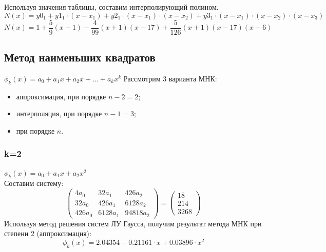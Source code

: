 \documentclass{article}
\begin{document}
Используя значения таблицы, составим интерполирующий полином.
\begin{displaymath} 
  N(x) = y0_1 + y1_{1} \cdot (x-x_1) + y2_1 \cdot (x-x_1) \cdot (x-x_2) +
  y3_1 \cdot (x-x_1) \cdot (x-x_2) \cdot (x-x_3) 
\end{displaymath}
\begin{displaymath} 
  N(x) = 1 + \frac{5}{9}(x+1) - \frac{4}{99}(x+1)(x-17) +
  \frac{5}{126}(x+1)(x-17)(x-6)
\end{displaymath}


\subsection{Метод наименьших квадратов}
$\phi_k(x) = a_0 + a_1x + a_2x + \ldots + a_kx^k$
Рассмотрим 3 варианта МНК:
\begin{itemize}
  \item аппроксимация, при порядке $n-2 = 2$;
  \item интерполяция, при порядке $n-1 = 3$;
  \item при порядке $n$.
\end{itemize}

\subsubsection{k=2}
$\phi_k(x) = a_0 + a_1x + a_2x^2$\\
Составим систему:
\begin{displaymath}
\left(
  \begin{array}{ccc}
    4 a_{0} & 32 a_{1} & 426 a_{2} \\
    32 a_{0} & 426 a_{1} & 6128 a_{2} \\
    426 a_{0} & 6128 a_{1} & 94818 a_{2} 
  \end{array}
\right)
=
\left(
  \begin{array}{ccc}
    18\\
    214\\
    3268
  \end{array}
\right)
\end{displaymath}
Используя метод решения систем ЛУ Гаусса, получим результат метода МНК при
степени 2 (аппроксимация):
\begin{displaymath}
\phi_k(x) = 
  2.04354 -
  0.21161 \cdot x +
  0.03896 \cdot x^2
\end{displaymath}
\end{document}
